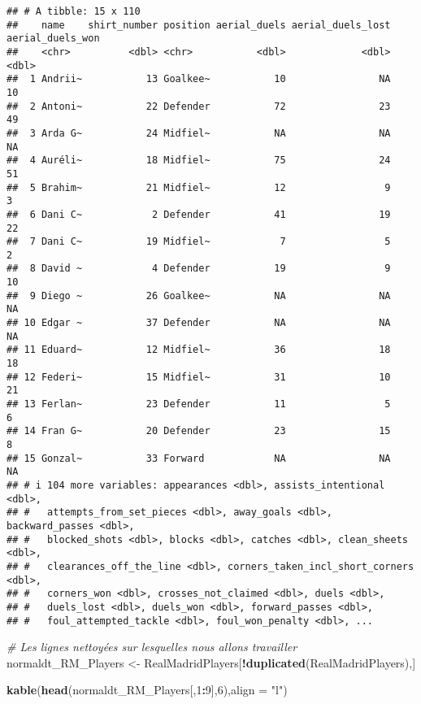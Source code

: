 \documentclass[
  6pt,
]{article}
\newenvironment{Shaded}{\begin{snugshade}}{\end{snugshade}}
\newcommand{\AttributeTok}[1]{\textcolor[rgb]{0.13,0.29,0.53}{#1}}
\newcommand{\CommentTok}[1]{\textcolor[rgb]{0.56,0.35,0.01}{\textit{#1}}}
\newcommand{\DecValTok}[1]{\textcolor[rgb]{0.00,0.00,0.81}{#1}}
\newcommand{\FunctionTok}[1]{\textcolor[rgb]{0.13,0.29,0.53}{\textbf{#1}}}
\newcommand{\NormalTok}[1]{#1}
\newcommand{\OtherTok}[1]{\textcolor[rgb]{0.56,0.35,0.01}{#1}}
\newcommand{\SpecialCharTok}[1]{\textcolor[rgb]{0.81,0.36,0.00}{\textbf{#1}}}
\newcommand{\StringTok}[1]{\textcolor[rgb]{0.31,0.60,0.02}{#1}}
\begin{document}
\begin{verbatim}
## # A tibble: 15 x 110
##    name    shirt_number position aerial_duels aerial_duels_lost aerial_duels_won
##    <chr>          <dbl> <chr>           <dbl>             <dbl>            <dbl>
##  1 Andrii~           13 Goalkee~           10                NA               10
##  2 Antoni~           22 Defender           72                23               49
##  3 Arda G~           24 Midfiel~           NA                NA               NA
##  4 Auréli~           18 Midfiel~           75                24               51
##  5 Brahim~           21 Midfiel~           12                 9                3
##  6 Dani C~            2 Defender           41                19               22
##  7 Dani C~           19 Midfiel~            7                 5                2
##  8 David ~            4 Defender           19                 9               10
##  9 Diego ~           26 Goalkee~           NA                NA               NA
## 10 Edgar ~           37 Defender           NA                NA               NA
## 11 Eduard~           12 Midfiel~           36                18               18
## 12 Federi~           15 Midfiel~           31                10               21
## 13 Ferlan~           23 Defender           11                 5                6
## 14 Fran G~           20 Defender           23                15                8
## 15 Gonzal~           33 Forward            NA                NA               NA
## # i 104 more variables: appearances <dbl>, assists_intentional <dbl>,
## #   attempts_from_set_pieces <dbl>, away_goals <dbl>, backward_passes <dbl>,
## #   blocked_shots <dbl>, blocks <dbl>, catches <dbl>, clean_sheets <dbl>,
## #   clearances_off_the_line <dbl>, corners_taken_incl_short_corners <dbl>,
## #   corners_won <dbl>, crosses_not_claimed <dbl>, duels <dbl>,
## #   duels_lost <dbl>, duels_won <dbl>, forward_passes <dbl>,
## #   foul_attempted_tackle <dbl>, foul_won_penalty <dbl>, ...
\end{verbatim}

\begin{Shaded}
\begin{Highlighting}[]
\CommentTok{\# Les lignes nettoyées sur lesquelles nous allons travailler  }
\NormalTok{normaldt\_RM\_Players }\OtherTok{\textless{}{-}}\NormalTok{ RealMadridPlayers[}\SpecialCharTok{!}\FunctionTok{duplicated}\NormalTok{(RealMadridPlayers),]}

\FunctionTok{kable}\NormalTok{(}\FunctionTok{head}\NormalTok{(normaldt\_RM\_Players[,}\DecValTok{1}\SpecialCharTok{:}\DecValTok{9}\NormalTok{],}\DecValTok{6}\NormalTok{),}\AttributeTok{align =} \StringTok{"l"}\NormalTok{)}
\end{Highlighting}
\end{Shaded}
\end{document}
